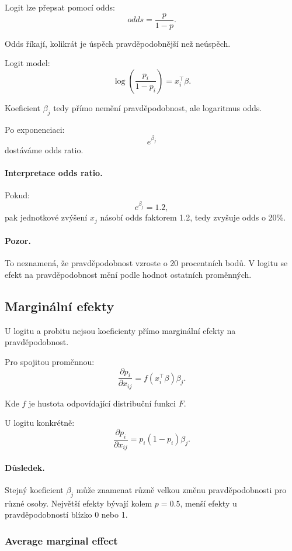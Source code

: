 Logit lze přepsat pomocí odds:
\[
odds = \frac{p}{1-p}.
\]

Odds říkají, kolikrát je úspěch pravděpodobnější než neúspěch.

Logit model:
\[
\log\left(\frac{p_i}{1-p_i}\right)
=
x_i^\top\beta.
\]

Koeficient $\beta_j$ tedy přímo nemění pravděpodobnost, ale logaritmus odds.

Po exponenciaci:
\[
e^{\beta_j}
\]
dostáváme odds ratio.

\paragraph{Interpretace odds ratio.}
Pokud:
\[
e^{\beta_j}=1.2,
\]
pak jednotkové zvýšení $x_j$ násobí odds faktorem 1.2, tedy zvyšuje odds o 20\%.

\paragraph{Pozor.}
To neznamená, že pravděpodobnost vzroste o 20 procentních bodů. V logitu se efekt na pravděpodobnost mění
podle hodnot ostatních proměnných.

\subsection{Marginální efekty}

U logitu a probitu nejsou koeficienty přímo marginální efekty na pravděpodobnost.

Pro spojitou proměnnou:
\[
\frac{\partial p_i}{\partial x_{ij}}
=
f(x_i^\top\beta)\beta_j.
\]

Kde $f$ je hustota odpovídající distribuční funkci $F$.

U logitu konkrétně:
\[
\frac{\partial p_i}{\partial x_{ij}}
=
p_i(1-p_i)\beta_j.
\]

\paragraph{Důsledek.}
Stejný koeficient $\beta_j$ může znamenat různě velkou změnu pravděpodobnosti pro různé osoby. Největší
efekty bývají kolem $p=0.5$, menší efekty u pravděpodobností blízko 0 nebo 1.

\subsubsection{Average marginal effect}

